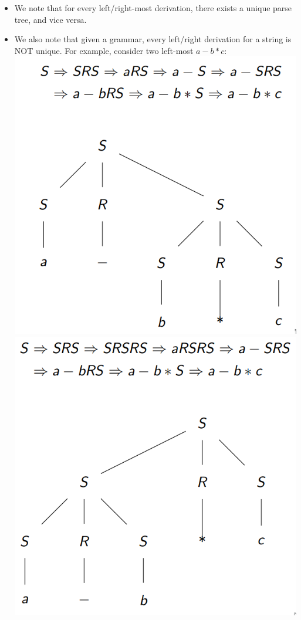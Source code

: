 \documentclass[12pt]{article}
\begin{document}
\begin{itemize}
    \item We note that for every left/right-most derivation, there exists a unique parse tree, and vice versa.
    \item We also note that given a grammar, every left/right derivation for a string is NOT unique.  For example, consider two left-most $a - b * c$: \\
        \includegraphics[scale=0.4]{parse_tree_three.png} \\
        \includegraphics[scale=0.5]{parse_tree_four.png}

\end{itemize}
\end{document}
